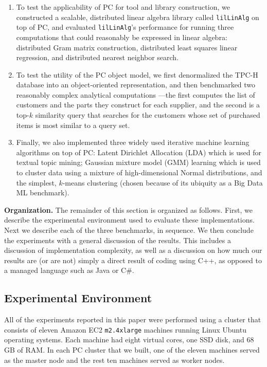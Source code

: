 \begin {enumerate}
\item To test the applicability of PC for tool and library construction, we constructed a scalable, distributed
linear algebra library
called \texttt{lilLinAlg} on top of PC, and evaluated \texttt{lilLinAlg}'s performance for running three
computations that could reasonably be expressed in linear algebra: distributed Gram matrix construction, 
distributed least squares linear regression, and distributed nearest neighbor search.

\item To test the utility of the PC object model, we first denormalized the TPC-H database \cite{council2008tpc} into an object-oriented 
representation, and then benchmarked two reasonably complex 
analytical computations ---the
first computes the list of customers and the parts they construct for each supplier, and the
second is a top-$k$ similarity query that searches for the customers whose set of purchased items is most similar
to a query set.

\item Finally, we also implemented three widely used
  iterative machine learning algorithms on top of PC: Latent Dirichlet Allocation (LDA) which is used for
  textual topic mining;
  Gaussian mixture model (GMM) learning which is used to cluster data using a mixture of high-dimensional Normal
  distributions, and the simplest, $k$-means clustering (chosen because of its ubiquity as a Big Data ML benchmark).
\end {enumerate}

\vspace{5 pt}
\noindent
\textbf{Organization.}  The remainder of this section is organized as follows.  First, we describe the experimental
environment used to evaluate these implementations.  
Next we describe each of the three benchmarks, in sequence. We then conclude the experiments with a general
discussion of the results.  This includes a discussion of implementation complexity, as well as a discussion on how much
our results are (or are not) simply a direct result of coding using C++, as opposed to a managed language such as Java or
C\#.

\subsection {Experimental Environment}

All of the experiments reported in this paper were performed using a
cluster that consists of eleven Amazon EC2 \texttt{m2.4xlarge}
machines running Linux Ubuntu operating systems. 
Each machine had eight virtual cores, one SSD
disk, and 68 GB of RAM. In each PC cluster that we built, one of the eleven machines served as the master
node and the rest ten machines served as worker nodes.

